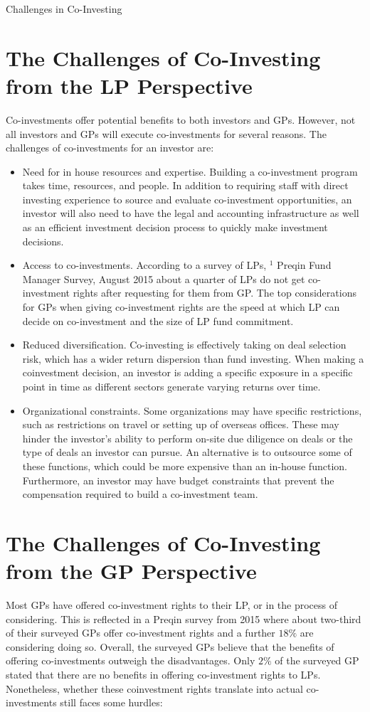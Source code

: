 \documentclass[11pt]{article}
\begin{document}
Challenges in Co-Investing

\section*{The Challenges of Co-Investing from the LP Perspective}
Co-investments offer potential benefits to both investors and GPs. However, not all investors and GPs will execute co-investments for several reasons. The challenges of co-investments for an investor are:

\begin{itemize}
  \item Need for in house resources and expertise. Building a co-investment program takes time, resources, and people. In addition to requiring staff with direct investing experience to source and evaluate co-investment opportunities, an investor will also need to have the legal and accounting infrastructure as well as an efficient investment decision process to quickly make investment decisions.
  \item Access to co-investments. According to a survey of LPs, ${ }^{1}$ Preqin Fund Manager Survey, August 2015 about a quarter of LPs do not get co-investment rights after requesting for them from GP. The top considerations for GPs when giving co-investment rights are the speed at which LP can decide on co-investment and the size of LP fund commitment.
  \item Reduced diversification. Co-investing is effectively taking on deal selection risk, which has a wider return dispersion than fund investing. When making a coinvestment decision, an investor is adding a specific exposure in a specific point in time as different sectors generate varying returns over time.
  \item Organizational constraints. Some organizations may have specific restrictions, such as restrictions on travel or setting up of overseas offices. These may hinder the investor's ability to perform on-site due diligence on deals or the type of deals an investor can pursue. An alternative is to outsource some of these functions, which could be more expensive than an in-house function. Furthermore, an investor may have budget constraints that prevent the compensation required to build a co-investment team.
\end{itemize}

\section*{The Challenges of Co-Investing from the GP Perspective}
Most GPs have offered co-investment rights to their LP, or in the process of considering. This is reflected in a Preqin survey from 2015 where about two-third of their surveyed GPs offer co-investment rights and a further $18 \%$ are considering doing so. Overall, the surveyed GPs believe that the benefits of offering co-investments outweigh the disadvantages. Only $2 \%$ of the surveyed GP stated that there are no benefits in offering co-investment rights to LPs. Nonetheless, whether these coinvestment rights translate into actual co-investments still faces some hurdles:
\end{document}
